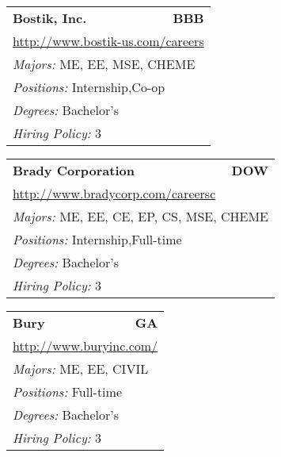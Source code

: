 \documentclass[twoside]{article}
\begin{document}
\begin{center}
\begin{multicols}{3}
\begin{FlushLeft}
\begin{minipage}{\columnwidth}
\end{minipage}
 
\begin{minipage}{\columnwidth}\begin{tabularx}{.95\columnwidth}{Xr}
                 {\Large\bf Bostik, Inc.} & {\Large\bf BBB}\\
    \multicolumn{2}{p{.95\columnwidth}}{\url{http://www.bostik-us.com/careers}}\\
    \multicolumn{2}{p{.95\columnwidth}}{\emph{Majors:} ME, EE, MSE, CHEME}\\
    \multicolumn{2}{p{.95\columnwidth}}{\emph{Positions:} Internship,Co-op}\\
    \multicolumn{2}{p{.95\columnwidth}}{\emph{Degrees:} Bachelor's}\\
    \multicolumn{2}{p{.95\columnwidth}}{\emph{Hiring Policy:} 3}\\
    \end{tabularx}
    
\end{minipage}
 
\begin{minipage}{\columnwidth}\begin{tabularx}{.95\columnwidth}{Xr}
                 {\Large\bf Brady Corporation} & {\Large\bf DOW}\\
    \multicolumn{2}{p{.95\columnwidth}}{\url{http://www.bradycorp.com/careersc}}\\
    \multicolumn{2}{p{.95\columnwidth}}{\emph{Majors:} ME, EE, CE, EP, CS, MSE, CHEME}\\
    \multicolumn{2}{p{.95\columnwidth}}{\emph{Positions:} Internship,Full-time}\\
    \multicolumn{2}{p{.95\columnwidth}}{\emph{Degrees:} Bachelor's}\\
    \multicolumn{2}{p{.95\columnwidth}}{\emph{Hiring Policy:} 3}\\
    \end{tabularx}
    
\end{minipage}
 
\begin{minipage}{\columnwidth}\begin{tabularx}{.95\columnwidth}{Xr}
                 {\Large\bf Bury} & {\Large\bf GA}\\
    \multicolumn{2}{p{.95\columnwidth}}{\url{http://www.buryinc.com/}}\\
    \multicolumn{2}{p{.95\columnwidth}}{\emph{Majors:} ME, EE, CIVIL}\\
    \multicolumn{2}{p{.95\columnwidth}}{\emph{Positions:} Full-time}\\
    \multicolumn{2}{p{.95\columnwidth}}{\emph{Degrees:} Bachelor's}\\
    \multicolumn{2}{p{.95\columnwidth}}{\emph{Hiring Policy:} 3}\\
    \end{tabularx}
    

\end{minipage}
\end{FlushLeft}
\end{multicols}
\end{center}
\end{document}
